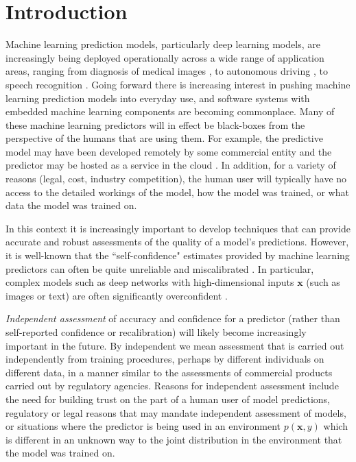 \documentclass{article}
\newcommand{\ux}{{\mathbf{x}}}
\newcommand{\robby}[1]{\textcolor{Red}{[#1]\textsubscript{Robby}}}
\begin{document}
\section{Introduction}

Machine learning prediction models, particularly deep learning models, are increasingly being deployed operationally across a wide range of application areas,  ranging from diagnosis of medical images \cite{kermany2018identifying}, to autonomous driving \cite{du2017fused}, to speech recognition \cite{hinton2012deep}.
Going forward there is increasing interest in pushing machine learning prediction models into everyday use, and software systems with embedded machine learning components are becoming commonplace.  
Many of these machine learning predictors will in effect be black-boxes from the perspective of  the humans that are using them. For example, the predictive model may have been developed remotely by some commercial entity  and the predictor may be hosted as a  service in the cloud  \cite{sanyal2018tapas}.
In addition, for a variety of reasons (legal, cost, industry competition), the human user will typically have no access to the detailed workings of the model, how the model was trained, or what data the model was trained on.  

In this context it is increasingly important to develop techniques that can provide accurate and robust assessments of the quality of a model's predictions.
However, it is well-known that the ``self-confidence" estimates provided by machine learning predictors can often be quite unreliable and miscalibrated \cite{zadrozny2002transforming,kull2017a}.
In particular, complex models such as deep networks with high-dimensional inputs $\ux$ (such as images or text) are often significantly overconfident \cite{gal2016dropout, guo2017calibration,lakshminarayanan2017simple,kuleshov2018accurate, keren2018calibrated}.  

{\it Independent assessment} of accuracy and confidence for a predictor (rather than self-reported confidence or recalibration) will likely become increasingly important in the future.
By independent we mean assessment that is carried out independently from training procedures, perhaps by different individuals on different data, in a manner similar to the assessments of commercial products carried out by  regulatory agencies.
Reasons for independent assessment include the need for  building trust on the part of a human user of model predictions,  regulatory or legal reasons that may mandate independent assessment of models, or situations where the predictor is being used in an environment $p(\ux, y)$ which is different in an unknown way to the joint distribution in the environment that the model was trained on.
\end{document}
